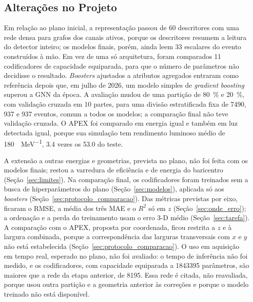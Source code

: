 \subsection{Alterações no Projeto}
\label{sec:alteracoes}

Em relação ao plano inicial, a representação passou de \num{60} descritores com uma rede densa para grafos dos canais ativos, porque os descritores resumem a leitura do detector inteiro; os modelos finais, porém, ainda leem \num{33} escalares do evento construídos à mão. Em vez de uma só arquitetura, foram comparados \num{11} codificadores de capacidade equiparada, para que o número de parâmetros não decidisse o resultado. \textit{Boosters} ajustados a atributos agregados entraram como referência depois que, em julho de 2026, um modelo simples de \textit{gradient boosting} superou a GNN da época. A avaliação mudou de uma partição de \qty{80}{\percent} e \qty{20}{\percent}, com validação cruzada em \num{10} partes, para uma divisão estratificada fixa de \num{7490}, \num{937} e \num{937} eventos, comum a todos os modelos; a comparação final não teve validação cruzada. O APEX foi comparado em energia igual e também em luz detectada igual, porque sua simulação tem rendimento luminoso médio de \qty{180}{\pe\per\MeV}, \num{3.4} vezes os \num{53.0} do teste.

A extensão a outras energias e geometrias, prevista no plano, não foi feita com os modelos finais; restou a varredura de eficiência e de energia do baricentro (Seção~\ref{sec:limites}). Na comparação final, os codificadores foram treinados sem a busca de hiperparâmetros do plano (Seção~\ref{sec:modelos}), aplicada só aos \textit{boosters} (Seção~\ref{sec:protocolo_comparacao}). Das métricas previstas por eixo, ficaram o RMSE, a média dos três MAE e o $R^2$ só em $z$ (Seção~\ref{sec:onde_erro}); a ordenação e a perda do treinamento usam o erro 3-D médio (Seção~\ref{sec:tarefa}). A comparação com o APEX, proposta por coordenada, ficou restrita a $z$ e à largura combinada, porque a correspondência das larguras transversais com $x$ e $y$ não está estabelecida (Seção~\ref{sec:protocolo_comparacao}). O uso em aquisição em tempo real, esperado no plano, não foi avaliado: o tempo de inferência não foi medido, e os codificadores, com capacidade equiparada a \num{1843395} parâmetros, são maiores que a rede da etapa anterior, de \num{8195}. Essa rede é citada, não reavaliada, porque usou outra partição e a geometria anterior às correções e porque o modelo treinado não está disponível.

